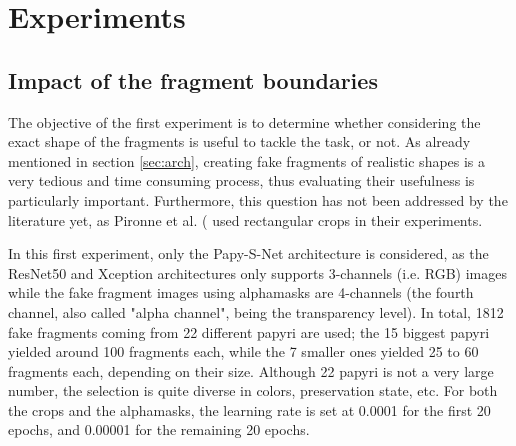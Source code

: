 \documentclass[11pt]{report}
\begin{document}
\section{Experiments}

\subsection{Impact of the fragment boundaries}\label{experimentbound}

The objective of the first experiment is to determine whether considering the exact shape of the fragments is useful to tackle the task, or not. As already mentioned in section \ref{sec:arch}, creating fake fragments of realistic shapes is a very tedious and time consuming process, thus evaluating their usefulness is particularly important. Furthermore, this question has not been addressed by the literature yet, as Pironne et al. (\cite{pir19} used rectangular crops in their experiments. \newline

In this first experiment, only the Papy-S-Net architecture is considered, as the ResNet50 and Xception architectures only supports 3-channels (i.e. RGB) images while the fake fragment images using alphamasks are 4-channels (the fourth channel, also called "alpha channel", being the transparency level).
In total, 1812 fake fragments coming from 22 different papyri are used; the 15 biggest papyri yielded around 100 fragments each, while the 7 smaller ones yielded 25 to 60 fragments each, depending on their size. Although 22 papyri is not a very large number, the selection is quite diverse in colors, preservation state, etc.\newline
For both the crops and the alphamasks, the learning rate is set at 0.0001 for the first 20 epochs, and 0.00001 for the remaining 20 epochs.
\end{document}
